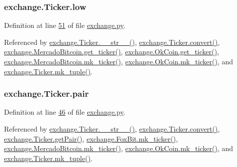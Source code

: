 \subsubsection[{\texorpdfstring{low}{low}}]{\setlength{\rightskip}{0pt plus 5cm}exchange.\+Ticker.\+low}\hypertarget{classexchange_1_1_ticker_a1c1f26a47a82fc799fcebf158e104405}{}\label{classexchange_1_1_ticker_a1c1f26a47a82fc799fcebf158e104405}


Definition at line \hyperlink{exchange_8py_source_l00051}{51} of file \hyperlink{exchange_8py_source}{exchange.\+py}.



Referenced by \hyperlink{exchange_8py_source_l00099}{exchange.\+Ticker.\+\_\+\+\_\+str\+\_\+\+\_\+()}, \hyperlink{exchange_8py_source_l00055}{exchange.\+Ticker.\+convert()}, \hyperlink{exchange_8py_source_l00306}{exchange.\+Mercado\+Bitcoin.\+get\+\_\+ticker()}, \hyperlink{exchange_8py_source_l00371}{exchange.\+Ok\+Coin.\+get\+\_\+ticker()}, \hyperlink{exchange_8py_source_l00320}{exchange.\+Mercado\+Bitcoin.\+mk\+\_\+ticker()}, \hyperlink{exchange_8py_source_l00385}{exchange.\+Ok\+Coin.\+mk\+\_\+ticker()}, and \hyperlink{exchange_8py_source_l00084}{exchange.\+Ticker.\+mk\+\_\+tuple()}.

\subsubsection[{\texorpdfstring{pair}{pair}}]{\setlength{\rightskip}{0pt plus 5cm}exchange.\+Ticker.\+pair}\hypertarget{classexchange_1_1_ticker_a382f9199d13a7b5929a26065fad4e491}{}\label{classexchange_1_1_ticker_a382f9199d13a7b5929a26065fad4e491}


Definition at line \hyperlink{exchange_8py_source_l00046}{46} of file \hyperlink{exchange_8py_source}{exchange.\+py}.



Referenced by \hyperlink{exchange_8py_source_l00099}{exchange.\+Ticker.\+\_\+\+\_\+str\+\_\+\+\_\+()}, \hyperlink{exchange_8py_source_l00055}{exchange.\+Ticker.\+convert()}, \hyperlink{exchange_8py_source_l00078}{exchange.\+Ticker.\+get\+Pair()}, \hyperlink{exchange_8py_source_l00245}{exchange.\+Fox\+Bit.\+mk\+\_\+ticker()}, \hyperlink{exchange_8py_source_l00320}{exchange.\+Mercado\+Bitcoin.\+mk\+\_\+ticker()}, \hyperlink{exchange_8py_source_l00385}{exchange.\+Ok\+Coin.\+mk\+\_\+ticker()}, and \hyperlink{exchange_8py_source_l00084}{exchange.\+Ticker.\+mk\+\_\+tuple()}.

